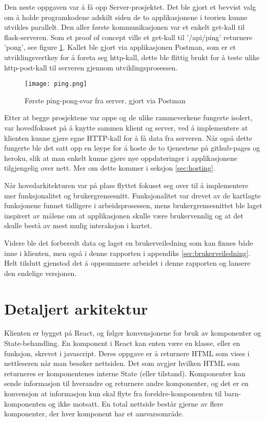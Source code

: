 Den neste oppgaven var å få opp Server-prosjektet. Det ble gjort et bevvist valg om å holde programkodene adskilt siden de to applikasjonene i teorien kunne utvikles parallelt. Den aller første kommunikasjonen var et enkelt get-kall til flask-serveren. Som et proof of concept ville et get-kall til '/api/ping' returnere 'pong', see figure \ref{fig:firstping}. Kallet ble gjort via applikasjonen Postman, som er et utviklingsvertkøy for å foreta seg http-kall, dette ble flittig brukt for å teste ulike http-post-kall til serveren gjennom utviklingsprosessen.

\begin{figure}[h]
    \center
    \texttt{[image: ping.png]}
    \caption{Første ping-pong-svar fra server, gjort via Postman}
    \label{fig:firstping}
\end{figure}

Etter at begge prosjektene var oppe og de ulike rammeverkene fungerte isolert, var hovedfokuset på å knytte sammen klient og server, ved å implementere at klienten kunne gjøre egne HTTP-kall for å få data fra serveren. Når også dette fungerte ble det satt opp en løype for å hoste de to tjenestene på github-pages og heroku, slik at man enkelt kunne gjøre nye oppdateringer i applikasjonene tilgjengelig over nett. Mer om dette kommer i seksjon \ref{sec:hosting}.

Når hovedarkitekturen var på plass flyttet fokuset seg over til å implementere mer funksjonalitet og brukergrensesnitt. Funksjonalitet var drevet av de kartlagte funksjonene funnet tidligere i arbeidsprosessen, mens brukergrensesnittet ble laget inspirert av målene om at applikasjonen skulle være brukervennlig og at det skulle bestå av mest mulig interaksjon i kartet.

Videre ble det forberedt data og laget en brukerveiledning som kan finnes både inne i klienten, men også i denne rapporten i appendiks \ref{sec:brukerveiledning}. Helt tilslutt gjenstod det å oppsummere arbeidet i denne rapporten og lansere den endelige versjonen.

\section{Detaljert arkitektur}

Klienten er bygget på React, og følger konvensjonene for bruk av komponenter og State-behandling. En komponent i React kan enten være en klasse, eller en funksjon, skrevet i javascript. Deres oppgave er å returnere HTML som vises i nettleseren når man besøker nettsiden. Det som avgjør hvilken HTML som returneres er komponentenes interne State (eller tilstand). Komponenter kan sende informasjon til hverandre og returnere andre komponenter, og det er en konvensjon at informasjon kun skal flyte fra foreldre-komponenten til barn-komponenten og ikke motsatt. En total nettside består gjerne av flere komponenter, der hver komponent har et ansvarsområde.

